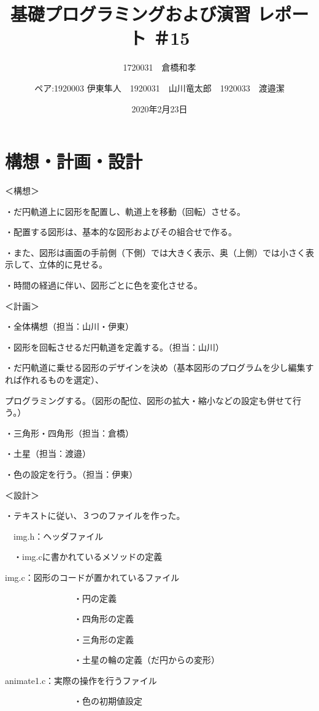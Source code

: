 \documentclass[12pt,a4j]{jarticle}
\begin{document}
\title{基礎プログラミングおよび演習 レポート ＃15}
\author{1720031　倉橋和孝}
\author{ペア:1920003 伊東隼人　1920031　山川竜太郎　1920033　渡邉潔}
\date{2020年2月23日}
\maketitle

\section{構想・計画・設計}

＜構想＞

・だ円軌道上に図形を配置し、軌道上を移動（回転）させる。

・配置する図形は、基本的な図形およびその組合せで作る。

・また、図形は画面の手前側（下側）では大きく表示、奥（上側）では小さく表示して、立体的に見せる。

・時間の経過に伴い、図形ごとに色を変化させる。

＜計画＞

・全体構想（担当：山川・伊東）

・図形を回転させるだ円軌道を定義する。（担当：山川）

・だ円軌道に乗せる図形のデザインを決め（基本図形のプログラムを少し編集すれば作れるものを選定）、

 プログラミングする。（図形の配位、図形の拡大・縮小などの設定も併せて行う。）
 
    ・三角形・四角形（担当：倉橋）
    
    ・土星（担当：渡邉）
    
・色の設定を行う。（担当：伊東）

＜設計＞

・テキストに従い、３つのファイルを作った。

　img.h：ヘッダファイル
 
　・img.cに書かれているメソッドの定義
        
  img.c：図形のコードが置かれているファイル
  
　　　　　　　　・円の定義
        
　　　　　　　　・四角形の定義
        
　　　　　　　　・三角形の定義
        
　　　　　　　　・土星の輪の定義（だ円からの変形）
        
  animate1.c：実際の操作を行うファイル
  
　　　　　　　　・色の初期値設定
        
\end{document}
